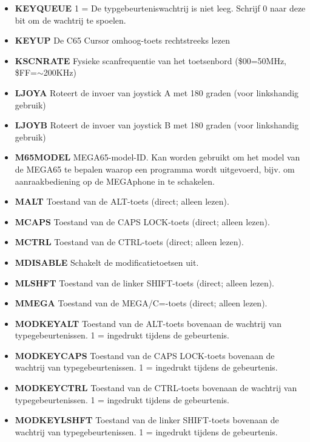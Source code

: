 \begin{itemize}
\item{\bf{KEYQUEUE}} 1 = De typgebeurteniswachtrij is niet leeg. Schrijf 0 naar deze bit om de wachtrij te spoelen.
\item{\bf{KEYUP}} De C65 Cursor omhoog-toets rechtstreeks lezen
\item{\bf{KSCNRATE}} Fysieke scanfrequentie van het toetsenbord (\$00=50MHz, \$FF=$\sim$200KHz)
\item{\bf{LJOYA}} Roteert de invoer van joystick A met 180 graden (voor linkshandig gebruik)
\item{\bf{LJOYB}} Roteert de invoer van joystick B met 180 graden (voor linkshandig gebruik)
\item{\bf{M65MODEL}} MEGA65-model-ID. Kan worden gebruikt om het model van de MEGA65 te bepalen waarop een programma wordt uitgevoerd, bijv. om aanraakbediening op de MEGAphone in te schakelen.
\item{\bf{MALT}} Toestand van de ALT-toets (direct; alleen lezen).
\item{\bf{MCAPS}} Toestand van de CAPS LOCK-toets (direct; alleen lezen).
\item{\bf{MCTRL}} Toestand van de CTRL-toets (direct; alleen lezen).
\item{\bf{MDISABLE}} Schakelt de modificatietoetsen uit.
\item{\bf{MLSHFT}} Toestand van de linker SHIFT-toets (direct; alleen lezen).
\item{\bf{MMEGA}} Toestand van de MEGA/C=-toets (direct; alleen lezen).
\item{\bf{MODKEYALT}} Toestand van de ALT-toets bovenaan de wachtrij van typegebeurtenissen. 1 = ingedrukt tijdens de gebeurtenis.
\item{\bf{MODKEYCAPS}} Toestand van de CAPS LOCK-toets bovenaan de wachtrij van typegebeurtenissen. 1 = ingedrukt tijdens de gebeurtenis.
\item{\bf{MODKEYCTRL}} Toestand van de CTRL-toets bovenaan de wachtrij van typegebeurtenissen. 1 = ingedrukt tijdens de gebeurtenis.
\item{\bf{MODKEYLSHFT}} Toestand van de linker SHIFT-toets bovenaan de wachtrij van typegebeurtenissen. 1 = ingedrukt tijdens de gebeurtenis.

\end{itemize}
